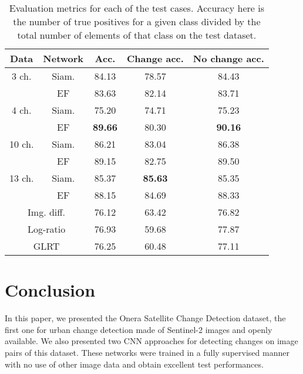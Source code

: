 \documentclass{article}
\begin{document}
\begin{table}
\begin{tabular}{cc|c|c|c}

Data & Network & Acc. & Change acc. & No change acc.\\
\hline \hline
 3 ch. & Siam.      & 84.13 & 78.57 & 84.43 \\
       & EF         & 83.63 & 82.14 & 83.71 \\  \hline
 4 ch. & Siam.      & 75.20 & 74.71 & 75.23 \\
       & EF         &  \cellcolor{ForestGreen!35}\textbf{89.66} & 80.30 & \cellcolor{ForestGreen!35}\textbf{90.16} \\  \hline
10 ch. & Siam.      & 86.21 & \cellcolor{GreenYellow!35}83.04 & 86.38 \\
       & EF         & \cellcolor{YellowGreen!35}89.15 & 82.75 & \cellcolor{YellowGreen!35}89.50 \\  \hline
13 ch. & Siam.      & 85.37 & \cellcolor{ForestGreen!35}\textbf{85.63} & 85.35 \\
       & EF         & \cellcolor{GreenYellow!35}88.15 & \cellcolor{YellowGreen!35}84.69 & \cellcolor{GreenYellow!35}88.33 \\  \hline \hline
 \multicolumn{2}{c|}{Img. diff.} & 76.12 & 63.42 & 76.82 \\ 
    \multicolumn{2}{c|}{Log-ratio} & 76.93 & 59.68 & 77.87 \\ 
    \multicolumn{2}{c|}{GLRT}    & 76.25 & 60.48 & 77.11 \\  \hline
\end{tabular}
\caption{Evaluation metrics for each of the test cases. Accuracy here is the number of true positives for a given class divided by the total number of elements of that class on the test dataset.}
\label{tab:results}
\end{table}

\section{Conclusion}
\label{sec:conclusion}


In this paper, we presented the Onera Satellite Change Detection dataset, the first one for urban change detection made of Sentinel-2 images and openly available. We also presented two CNN approaches for detecting changes on image pairs of this dataset. These networks were trained in a fully supervised manner with no use of other image data and obtain excellent test performances.
\end{document}
